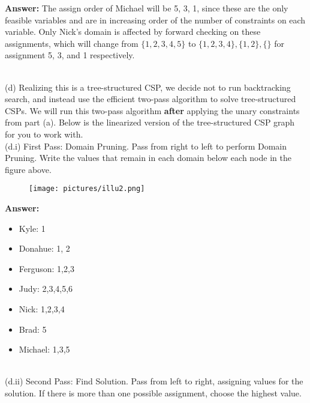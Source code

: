 \documentclass{article}
\begin{document}
\textbf{Answer:} The assign order of Michael will be 5, 3, 1, since these are the only feasible variables and are in increasing order of the number of constraints on each variable. Only Nick's domain is affected by forward checking on these assignments, which will change from $\{1, 2, 3, 4, 5\} $ to $ \{1, 2, 3, 4\}, \{1, 2\}, \{\}$ for assignment 5, 3, and 1 respectively.

~\\

\noindent (d) Realizing this is a tree-structured CSP, we decide not to run backtracking search, and instead use the efficient two-pass algorithm to solve tree-structured CSPs. We will run this two-pass algorithm \textbf{after} applying the unary constraints from part (a). Below is the linearized version of the tree-structured CSP graph for you to work with. \\


\noindent (d.i) First Pass: Domain Pruning. Pass from right to left to perform Domain Pruning. Write the values that remain in each domain below each node in the figure above.

\begin{figure}[h]
\centering
\texttt{[image: pictures/illu2.png]}
\end{figure}

\textbf{Answer:} 

\begin{itemize}
    \item Kyle: 1
    
    \item Donahue: 1, 2
    
    \item Ferguson: 1,2,3
    
    \item Judy: 2,3,4,5,6

    \item Nick: 1,2,3,4

    \item Brad: 5

    \item Michael: 1,3,5
\end{itemize}

~\\

\noindent (d.ii) Second Pass: Find Solution. Pass from left to right, assigning values for the solution. If there is more than one possible assignment, choose the highest value.
\end{document}
